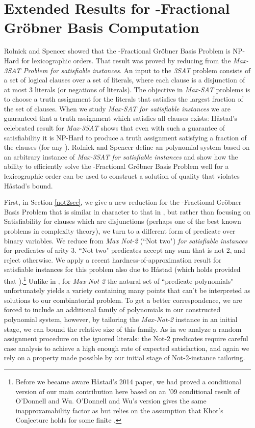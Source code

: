 \documentclass{article}
\begin{document}
\section{Extended Results for -Fractional Gr\"{o}bner Basis Computation}
Rolnick and Spencer showed that the  -Fractional Gr\"{o}bner Basis Problem is NP-Hard for lexicographic orders. 
That result was proved by reducing from the \textit{Max-3SAT Problem for satisfiable instances}. An input to the \textit{3SAT} problem consists of a set of logical clauses over a set of literals, where each clause is a disjunction of at most 3 literals (or negations of literals). 
The objective in \textit{Max-SAT} problems is to choose a truth assignment for the literals that satisfies the largest fraction of the set of clauses. When we study \textit{Max-SAT for satisfiable instances} we are guaranteed that a truth assignment which satisfies all clauses exists: H{\aa}stad's celebrated result for \textit{Max-3SAT} shows that even with such a guarantee of satisfiability it is NP-Hard to produce a truth assignment satisfying a  fraction of the clauses (for any ).  Rolnick and Spencer define an polynomial system based on an arbitrary instance of \textit{Max-3SAT for satisfiable instances} and show how the ability to efficiently solve the -Fractional Gr\"{o}bner Basis Problem well for a lexicographic order can be used to construct a solution of quality that violates H{\aa}stad's bound. 

First, in Section \ref{not2sec}, we give a
new reduction for the -Fractional Gr\"{o}bner Basis Problem  that is similar in character to that in \citep{RS}, but rather than focusing on Satisfiability for clauses which are disjunctions
(perhaps one of the best known problems in complexity theory),
we turn to a different form of predicate over binary  variables. We reduce from \textit{Max Not-2} (``Not two") \textit{for satisfiable instances} for predicates of arity 3. ``Not two" predicates accept any sum that is not 2, and reject otherwise. We apply a recent  hardness-of-approximation result for satisfiable instances for this problem also due to H{\aa}stad (which holds
provided that ).\footnote{Before we became aware H{\aa}stad's 2014 paper, we had proved a conditional version of our main contribution here based on an '09 conditional result of O'Donnell and Wu.  O'Donnell and Wu's version gives the same inapproxamability factor as \citep{hast14} but relies on the assumption that Khot's  Conjecture holds for some finite .}
Unlike in \citep{RS}, for \textit{Max-Not-2} the natural set of ``predicate polynomials" unfortunately yields a variety containing many points that can't be interpreted as solutions to our combinatorial problem. To get a better correspondence, we are forced to include an additional family of polynomials in our constructed polynomial system, however, by tailoring the \textit{Max-Not-2} instance in an initial stage, we can bound the relative size of this family. As in \citep{RS} we analyze a random assignment procedure on the ignored literals: the Not-2 predicates require careful case analysis to achieve a high enough rate of expected satisfaction, and again we rely on a property made possible by our initial stage of Not-2-instance tailoring. 
\end{document}
